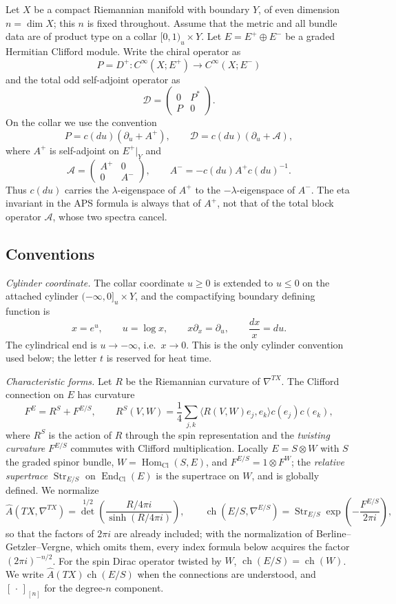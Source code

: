 \documentclass[12pt,oneside,reqno]{article}
\theoremstyle{plain}
\theoremstyle{definition}
\theoremstyle{remark}
\begin{document}
Let $X$ be a compact Riemannian manifold with boundary $Y$, of even
dimension \(n=\dim X\); this \(n\) is fixed throughout. Assume that the metric and all bundle data are of product type on a
collar $[0,1)_u\times Y$. Let $E=E^+\oplus E^-$ be a graded Hermitian
Clifford module. Write the chiral operator as
\[
 P=D^+:C^\infty(X;E^+)\longrightarrow C^\infty(X;E^-)
\]
and the total odd self-adjoint operator as
\[
 \mathcal D=\begin{pmatrix}0&P^*\\P&0\end{pmatrix}.
\]
On the collar we use the convention
\[
 P=c(du)(\partial_u+A^+),
 \qquad
 \mathcal D=c(du)(\partial_u+\mathcal A),
\]
where \(A^+\) is self-adjoint on \(E^+|_Y\) and
\[
 \mathcal A=\begin{pmatrix}A^+&0\\0&A^-\end{pmatrix},
 \qquad
 A^-=-c(du)A^+c(du)^{-1}.
\]
Thus \(c(du)\) carries the \(\lambda\)-eigenspace of \(A^+\) to the
\(-\lambda\)-eigenspace of \(A^-\). The eta invariant in the APS formula
is always that of \(A^+\), not that of the total block operator
\(\mathcal A\), whose two spectra cancel.

\subsection{Conventions}\label{subsec:conventions}

\emph{Cylinder coordinate.} The collar coordinate \(u\geq0\) is extended
to \(u\leq0\) on the attached cylinder \((-\infty,0]_u\times Y\), and the
compactifying boundary defining function is
\[
 x=e^{u},\qquad u=\log x,\qquad x\partial_x=\partial_u,\qquad
 \frac{dx}x=du .
\]
The cylindrical end is \(u\to-\infty\), i.e.\ \(x\to0\). This is the only
cylinder convention used below; the letter \(t\) is reserved for heat time.

\emph{Characteristic forms.} Let \(R\) be the Riemannian curvature of
\(\nabla^{TX}\). The Clifford connection on \(E\) has curvature
\[
 F^E=R^S+F^{E/S},\qquad
 R^S(V,W)=\frac14\sum_{j,k}\langle R(V,W)e_j,e_k\rangle c(e_j)c(e_k),
\]
where \(R^S\) is the action of \(R\) through the spin representation and
the \emph{twisting curvature} \(F^{E/S}\) commutes with Clifford
multiplication. Locally \(E=S\otimes W\) with \(S\) the graded spinor
bundle, \(W=\operatorname{Hom}_{\mathrm{Cl}}(S,E)\), and
\(F^{E/S}=1\otimes F^W\); the \emph{relative supertrace}
\(\operatorname{Str}_{E/S}\) on \(\operatorname{End}_{\mathrm{Cl}}(E)\) is
the supertrace on \(W\), and is globally defined. We normalize
\[
 \widehat A(TX,\nabla^{TX})
 ={\det}^{1/2}\!\left(\frac{R/4\pi i}{\sinh(R/4\pi i)}\right),
 \qquad
 \operatorname{ch}(E/S,\nabla^{E/S})
 =\operatorname{Str}_{E/S}\exp\!\left(-\frac{F^{E/S}}{2\pi i}\right),
\]
so that the factors of \(2\pi i\) are already included; with the
normalization of Berline--Getzler--Vergne, which omits them, every
index formula below acquires the factor \((2\pi i)^{-n/2}\). For the spin
Dirac operator twisted by \(W\), \(\operatorname{ch}(E/S)=\operatorname{ch}(W)\).
We write \(\widehat A(TX)\operatorname{ch}(E/S)\) when the connections are
understood, and \([\,\cdot\,]_{[n]}\) for the degree-\(n\) component.
\end{document}
